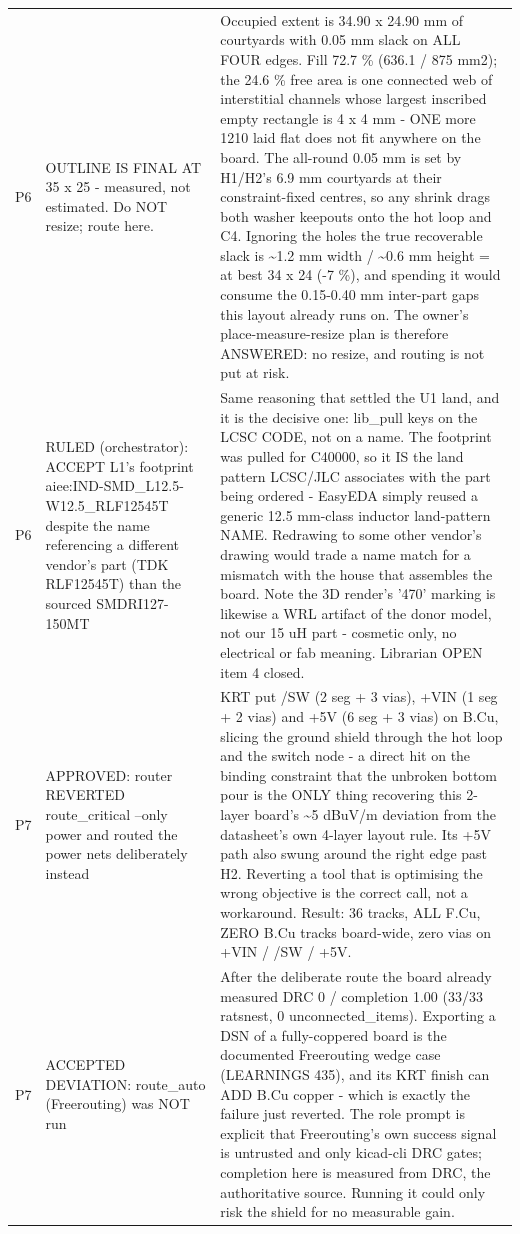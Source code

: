\documentclass[11pt,a4paper]{article}
\begin{document}
{\begin{longtable}{lp{5.2cm}p{7.2cm}}
P6 & OUTLINE IS FINAL AT 35 x 25 - measured, not estimated. Do NOT resize; route here. & Occupied extent is 34.90 x 24.90 mm of courtyards with 0.05 mm slack on ALL FOUR edges. Fill 72.7 \% (636.1 / 875 mm2); the 24.6 \% free area is one connected web of interstitial channels whose largest inscribed empty rectangle is 4 x 4 mm - ONE more 1210 laid flat does not fit anywhere on the board. The all-round 0.05 mm is set by H1/H2's 6.9 mm courtyards at their constraint-fixed centres, so any shrink drags both washer keepouts onto the hot loop and C4. Ignoring the holes the true recoverable slack is \textasciitilde{}1.2 mm width / \textasciitilde{}0.6 mm height = at best 34 x 24 (-7 \%), and spending it would consume the 0.15-0.40 mm inter-part gaps this layout already runs on. The owner's place-measure-resize plan is therefore ANSWERED: no resize, and routing is not put at risk. \\
P6 & RULED (orchestrator): ACCEPT L1's footprint aiee:IND-SMD\_L12.5-W12.5\_RLF12545T despite the name referencing a different vendor's part (TDK RLF12545T) than the sourced SMDRI127-150MT & Same reasoning that settled the U1 land, and it is the decisive one: lib\_pull keys on the LCSC CODE, not on a name. The footprint was pulled for C40000, so it IS the land pattern LCSC/JLC associates with the part being ordered - EasyEDA simply reused a generic 12.5 mm-class inductor land-pattern NAME. Redrawing to some other vendor's drawing would trade a name match for a mismatch with the house that assembles the board. Note the 3D render's '470' marking is likewise a WRL artifact of the donor model, not our 15 uH part - cosmetic only, no electrical or fab meaning. Librarian OPEN item 4 closed. \\
P7 & APPROVED: router REVERTED route\_critical --only power and routed the power nets deliberately instead & KRT put /SW (2 seg + 3 vias), +VIN (1 seg + 2 vias) and +5V (6 seg + 3 vias) on B.Cu, slicing the ground shield through the hot loop and the switch node - a direct hit on the binding constraint that the unbroken bottom pour is the ONLY thing recovering this 2-layer board's \textasciitilde{}5 dBuV/m deviation from the datasheet's own 4-layer layout rule. Its +5V path also swung around the right edge past H2. Reverting a tool that is optimising the wrong objective is the correct call, not a workaround. Result: 36 tracks, ALL F.Cu, ZERO B.Cu tracks board-wide, zero vias on +VIN / /SW / +5V. \\
P7 & ACCEPTED DEVIATION: route\_auto (Freerouting) was NOT run & After the deliberate route the board already measured DRC 0 / completion 1.00 (33/33 ratsnest, 0 unconnected\_items). Exporting a DSN of a fully-coppered board is the documented Freerouting wedge case (LEARNINGS 435), and its KRT finish can ADD B.Cu copper - which is exactly the failure just reverted. The role prompt is explicit that Freerouting's own success signal is untrusted and only kicad-cli DRC gates; completion here is measured from DRC, the authoritative source. Running it could only risk the shield for no measurable gain. \\

\end{longtable}}
\end{document}
